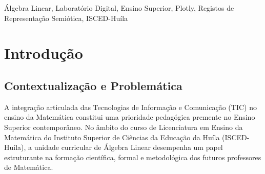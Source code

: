 \documentclass[conference]{IEEEtran}
\begin{document}
\maketitle

\begin{abstract}
O ensino da Álgebra Linear no Ensino Superior enfrenta desafios decorrentes do elevado nível de abstracção teórica e da dificuldade dos estudantes em coordenar registos de representação algébricos, numéricos e gráficos. Para responder a esta problemática educacional no contexto do ISCED-Huíla, este artigo apresenta o desenvolvimento e a avaliação empírica do LIDAL (Laboratório Interactivo Digital de Álgebra Linear), uma plataforma web interactiva concebida em Python com os frameworks Streamlit, NumPy, SymPy e Plotly. O ecossistema está organizado em seis módulos matemáticos nucleares, complementados por módulos de exploração gráfica livre, gamificação e conteúdo teórico, e fundamenta-se numa sequência didáctica interactiva baseada no ciclo Explorar--Observar--Interpretar--Experimentar--Verificar. A metodologia seguiu um estudo de caso misto com 32 estudantes do 1.\textordmasculine{} Ano da licenciatura em Ensino da Matemática do ISCED-Huíla. Os resultados quantitativos demonstraram um ganho de aprendizagem estatisticamente significativo do pré-teste para o pós-teste (aumento da média de 42,5\% para 81,2\%, $p < 0{,}001$, $d = 3{,}92$) e uma apreciação altamente favorável nos critérios pedagógicos e de usabilidade (superior a 90\% de concordância). Conclui-se que a mediação tecnológica promovida pelo LIDAL fortalece a intuição geométrica e a capacidade conceptual na resolução de problemas matriciais e vectoriais.
\end{abstract}

\begin{IEEEkeywords}
Álgebra Linear, Laboratório Digital, Ensino Superior, Plotly, Registos de Representação Semiótica, ISCED-Huíla
\end{IEEEkeywords}

\section{Introdução}

\subsection{Contextualização e Problemática}

A integração articulada das Tecnologias de Informação e Comunicação (TIC) no ensino da Matemática constitui uma prioridade pedagógica premente no Ensino Superior contemporâneo. No âmbito do curso de Licenciatura em Ensino da Matemática do Instituto Superior de Ciências da Educação da Huíla (ISCED-Huíla), a unidade curricular de Álgebra Linear desempenha um papel estruturante na formação científica, formal e metodológica dos futuros professores de Matemática.
\end{document}
